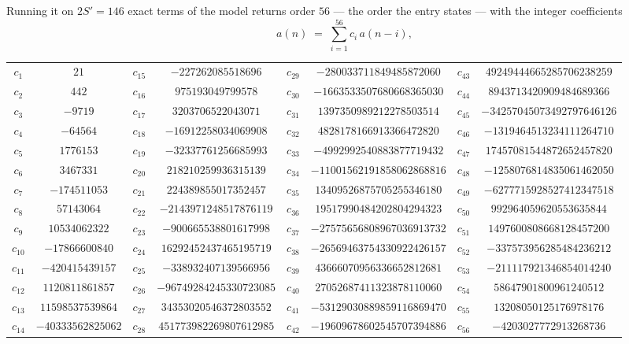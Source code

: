 \documentclass[11pt,a4paper]{article}
\theoremstyle{plain}
\theoremstyle{definition}
\begin{document}
Running it on $2S'=146$ exact terms of the model returns order $56$ --- the order the
entry states --- with the integer coefficients
\[
a(n)\;=\;\sum_{i=1}^{56}c_i\,a(n-i),
\]
\begin{center}\small
\begin{tabular}{cccccccc}
$c_{1}$ & $21$ & $c_{15}$ & $-227262085518696$ & $c_{29}$ & $-280033711849485872060$ & $c_{43}$ & $49249444665285706238259$ \\
$c_{2}$ & $442$ & $c_{16}$ & $975193049799578$ & $c_{30}$ & $-1663533507680668365030$ & $c_{44}$ & $8943713420909484689366$ \\
$c_{3}$ & $-9719$ & $c_{17}$ & $3203706522043071$ & $c_{31}$ & $1397350989212278503514$ & $c_{45}$ & $-34257045073492797646126$ \\
$c_{4}$ & $-64564$ & $c_{18}$ & $-16912258034069908$ & $c_{32}$ & $4828178166913366472820$ & $c_{46}$ & $-1319464513234111264710$ \\
$c_{5}$ & $1776153$ & $c_{19}$ & $-32337761256685993$ & $c_{33}$ & $-4992992540883877719432$ & $c_{47}$ & $17457081544872652457820$ \\
$c_{6}$ & $3467331$ & $c_{20}$ & $218210259936315139$ & $c_{34}$ & $-11001562191858062868816$ & $c_{48}$ & $-1258076814835061462050$ \\
$c_{7}$ & $-174511053$ & $c_{21}$ & $224389855017352457$ & $c_{35}$ & $13409526875705255346180$ & $c_{49}$ & $-6277715928527412347518$ \\
$c_{8}$ & $57143064$ & $c_{22}$ & $-2143971248517876119$ & $c_{36}$ & $19517990484202804294323$ & $c_{50}$ & $992964059620553635844$ \\
$c_{9}$ & $10534062322$ & $c_{23}$ & $-900665538801617998$ & $c_{37}$ & $-27575656808967036913732$ & $c_{51}$ & $1497600808668128457200$ \\
$c_{10}$ & $-17866600840$ & $c_{24}$ & $16292452437465195719$ & $c_{38}$ & $-26569463754330922426157$ & $c_{52}$ & $-337573956285484236212$ \\
$c_{11}$ & $-420415439157$ & $c_{25}$ & $-338932407139566956$ & $c_{39}$ & $43666070956336652812681$ & $c_{53}$ & $-211117921346854014240$ \\
$c_{12}$ & $1120811861857$ & $c_{26}$ & $-96749284245330723085$ & $c_{40}$ & $27052687411323878110060$ & $c_{54}$ & $58647901800961240512$ \\
$c_{13}$ & $11598537539864$ & $c_{27}$ & $34353020546372803552$ & $c_{41}$ & $-53129030889859116869470$ & $c_{55}$ & $13208050125176978176$ \\
$c_{14}$ & $-40333562825062$ & $c_{28}$ & $451773982269807612985$ & $c_{42}$ & $-19609678602545707394886$ & $c_{56}$ & $-4203027772913268736$ \\
\end{tabular}
\end{center}
\end{document}
